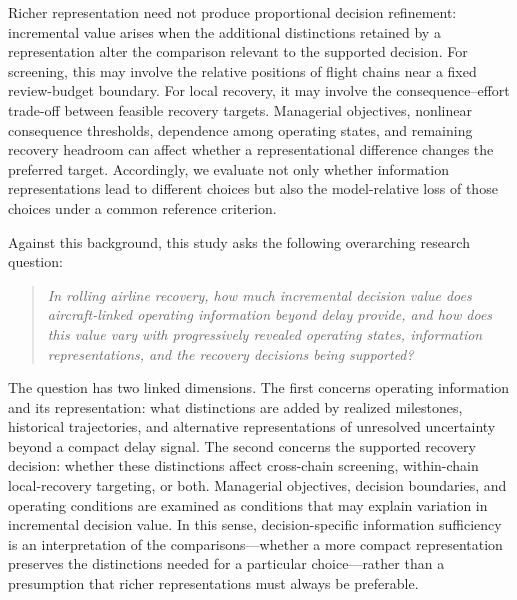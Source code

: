 Richer representation need not produce proportional decision refinement: incremental value arises when the additional distinctions retained by a representation alter the comparison relevant to the supported decision. For screening, this may involve the relative positions of flight chains near a fixed review-budget boundary. For local recovery, it may involve the consequence--effort trade-off between feasible recovery targets. Managerial objectives, nonlinear consequence thresholds, dependence among operating states, and remaining recovery headroom can affect whether a representational difference changes the preferred target. Accordingly, we evaluate not only whether information representations lead to different choices but also the model-relative loss of those choices under a common reference criterion.

Against this background, this study asks the following overarching research question:

\begin{quote}
\emph{In rolling airline recovery, how much incremental decision value does aircraft-linked operating information beyond delay provide, and how does this value vary with progressively revealed operating states, information representations, and the recovery decisions being supported?}
\end{quote}

The question has two linked dimensions. The first concerns operating information and its representation: what distinctions are added by realized milestones, historical trajectories, and alternative representations of unresolved uncertainty beyond a compact delay signal. The second concerns the supported recovery decision: whether these distinctions affect cross-chain screening, within-chain local-recovery targeting, or both. Managerial objectives, decision boundaries, and operating conditions are examined as conditions that may explain variation in incremental decision value. In this sense, decision-specific information sufficiency is an interpretation of the comparisons---whether a more compact representation preserves the distinctions needed for a particular choice---rather than a presumption that richer representations must always be preferable.

